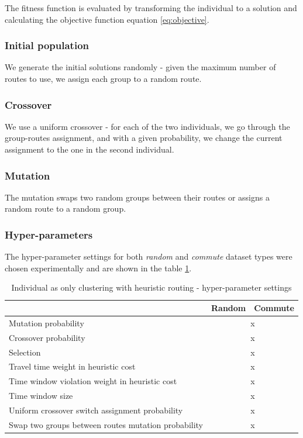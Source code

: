 The fitness function is evaluated by transforming the individual to a solution and calculating the objective function equation \ref{eq:objective}.

\subsubsection{Initial population}

We generate the initial solutions randomly - given the maximum number of routes to use, we assign each group to a random route.

\subsubsection{Crossover}

We use a uniform crossover - for each of the two individuals, we go through the group-routes assignment, and with a given probability, we change the current assignment to the one in the second individual.

\subsubsection{Mutation}

The mutation swaps two random groups between their routes or assigns a random route to a random group.

\subsubsection{Hyper-parameters}

The hyper-parameter settings for both \textit{random} and \textit{commute} dataset types were chosen experimentally and are shown in the table \ref{tab:evo_ch_hyperparams}.

\begin{table}[ht]
    \centering
    \begin{tabular}{lcc}
         & Random & Commute \\
        \hline
        Mutation probability & \multicolumn{2}{c}{x} \\
        Crossover probability & \multicolumn{2}{c}{x} \\
        Selection & \multicolumn{2}{c}{x} \\
        Travel time weight in heuristic cost & \multicolumn{2}{c}{x} \\
        Time window violation weight in heuristic cost & \multicolumn{2}{c}{x} \\
        Time window size & \multicolumn{2}{c}{x} \\
        Uniform crossover switch assignment probability & \multicolumn{2}{c}{x} \\
        Swap two groups between routes mutation probability & \multicolumn{2}{c}{x} \\
    \end{tabular}
    \caption{Individual as only clustering with heuristic routing - hyper-parameter settings}
    \label{tab:evo_ch_hyperparams}
\end{table}

